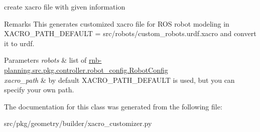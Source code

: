 create xacro file with given information 

\begin{DoxyRemark}{Remarks}
This generates customized xacro file for R\+OS robot modeling in X\+A\+C\+R\+O\+\_\+\+P\+A\+T\+H\+\_\+\+D\+E\+F\+A\+U\+LT = \textquotesingle{}src/robots/custom\+\_\+robots.\+urdf.\+xacro\textquotesingle{} and convert it to urdf. 
\end{DoxyRemark}

\begin{DoxyParams}{Parameters}
{\em robots} & list of \hyperlink{classrnb-planning_1_1src_1_1pkg_1_1controller_1_1robot__config_1_1_robot_config}{rnb-\/planning.\+src.\+pkg.\+controller.\+robot\+\_\+config.\+Robot\+Config} \\
\hline
{\em xacro\+\_\+path} & by default X\+A\+C\+R\+O\+\_\+\+P\+A\+T\+H\+\_\+\+D\+E\+F\+A\+U\+LT is used, but you can specify your own path. \\
\hline
\end{DoxyParams}


The documentation for this class was generated from the following file\+:\begin{DoxyCompactItemize}
\item 
src/pkg/geometry/builder/xacro\+\_\+customizer.\+py\end{DoxyCompactItemize}

